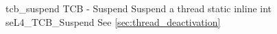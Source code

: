 %
%
%
%

\apidoc
{tcb_suspend}
{TCB - Suspend}
{Suspend a thread}
{static inline int seL4\_TCB\_Suspend}
{
}
{\errorenumdesc}
{See \autoref{sec:thread_deactivation}}
